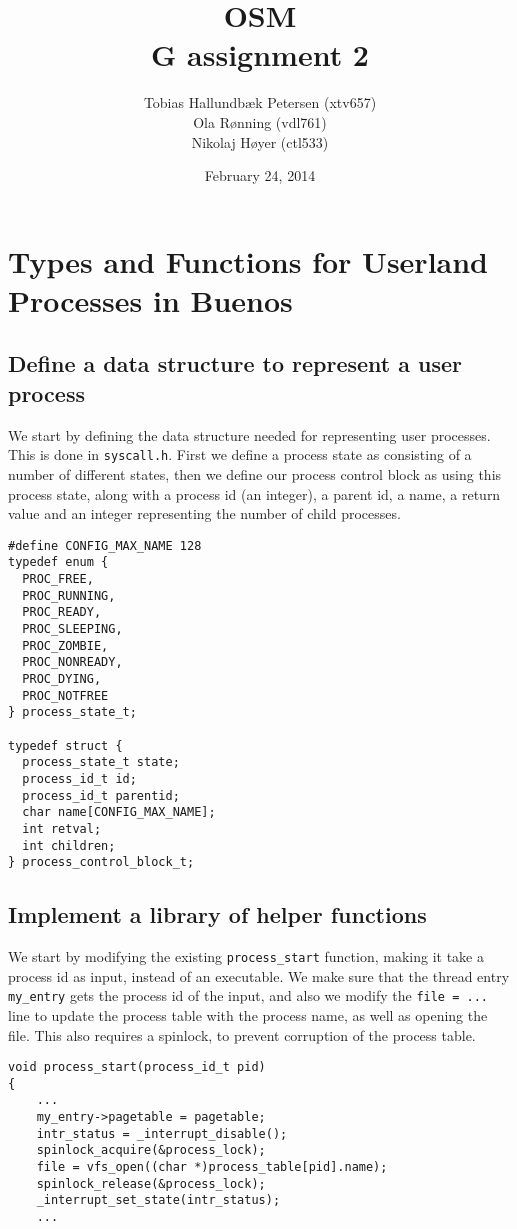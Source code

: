 \documentclass[a4paper,12pt]{article}
\title{OSM\\G assignment 2}
\author{Tobias Hallundbæk Petersen (xtv657)\\Ola Rønning (vdl761)\\Nikolaj Høyer (ctl533)}
\date{February 24, 2014}
\begin{document}
\maketitle
\tableofcontents
\newpage
\section{Types and Functions for Userland Processes in Buenos}
\subsection{Define a data structure to represent a user process}

We start by defining the data structure needed for representing user processes. This is done in \texttt{syscall.h}. First we define a process state as consisting of a number of different states, then we define our process control block as using this process state, along with a process id (an integer), a parent id, a name, a return value and an integer representing the number of child processes.
\begin{lstlisting}
#define CONFIG_MAX_NAME 128
typedef enum {
  PROC_FREE,
  PROC_RUNNING,
  PROC_READY,
  PROC_SLEEPING,
  PROC_ZOMBIE,
  PROC_NONREADY,
  PROC_DYING,
  PROC_NOTFREE
} process_state_t;

typedef struct {
  process_state_t state;
  process_id_t id;
  process_id_t parentid;
  char name[CONFIG_MAX_NAME];
  int retval;
  int children;
} process_control_block_t;
\end{lstlisting}

\subsection{Implement a library of helper functions}
We start by modifying the existing \texttt{process\_start} function, making it take a process id as input, instead of an executable. We make sure that the thread entry \texttt{my\_entry} gets the process id of the input, and also we modify the \texttt{file = ...} line to update the process table with the process name, as well as opening the file. This also requires a spinlock, to prevent corruption of the process table.
\begin{lstlisting}
void process_start(process_id_t pid)
{
	...
    my_entry->pagetable = pagetable;
    intr_status = _interrupt_disable();
    spinlock_acquire(&process_lock);
    file = vfs_open((char *)process_table[pid].name);
    spinlock_release(&process_lock);
    _interrupt_set_state(intr_status);
    ...
\end{lstlisting}
\end{document}
